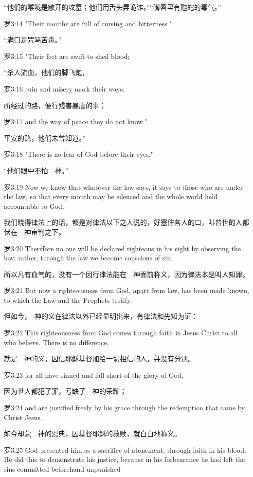 \documentclass[a4paper,11pt,onecolumn,twoside]{ctexart}
\begin{document}
\begin{multicols}{2}
 “他们的喉咙是敞开的坟墓；他们用舌头弄诡诈。”“嘴唇里有虺蛇的毒气。”


 罗3:14
 "Their mouths are full of cursing and bitterness."

 “满口是咒骂苦毒。”


 罗3:15
 "Their feet are swift to shed blood;

 “杀人流血，他们的脚飞跑，


 罗3:16
 ruin and misery mark their ways,

 所经过的路，便行残害暴虐的事；


 罗3:17
 and the way of peace they do not know."

 平安的路，他们未曾知道。”


 罗3:18
 "There is no fear of God before their eyes."

 “他们眼中不怕　神。”


 罗3:19
 Now we know that whatever the law says, it says to those who are under the law, so that every mouth may be silenced and the whole world held accountable to God.

 我们晓得律法上的话，都是对律法以下之人说的，好塞住各人的口，叫普世的人都伏在　神审判之下。


 罗3:20
 Therefore no one will be declared righteous in his sight by observing the law; rather, through the law we become conscious of sin.

 所以凡有血气的，没有一个因行律法能在　神面前称义，因为律法本是叫人知罪。


 罗3:21
 But now a righteousness from God, apart from law, has been made known, to which the Law and the Prophets testify.

 但如今，　神的义在律法以外已经显明出来，有律法和先知为证：


 罗3:22
 This righteousness from God comes through faith in Jesus Christ to all who believe. There is no difference,

 就是　神的义，因信耶稣基督加给一切相信的人，并没有分别。


 罗3:23
 for all have sinned and fall short of the glory of God,

 因为世人都犯了罪，亏缺了　神的荣耀；


 罗3:24
 and are justified freely by his grace through the redemption that came by Christ Jesus.

 如今却蒙　神的恩典，因基督耶稣的救赎，就白白地称义。


 罗3:25
 God presented him as a sacrifice of atonement, through faith in his blood. He did this to demonstrate his justice, because in his forbearance he had left the sins committed beforehand unpunished--


\end{multicols}
\end{document}
